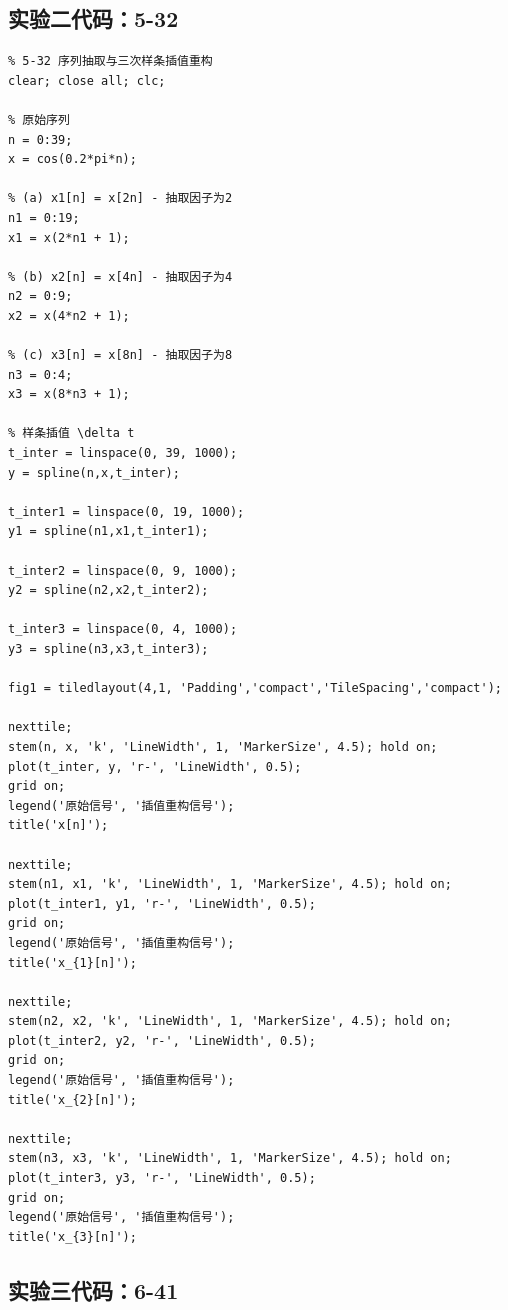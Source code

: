 \documentclass[UTF8,12pt,a4paper]{ctexart}
\begin{document}
\subsection{实验二代码：5-32}

\begin{lstlisting}
% 5-32 序列抽取与三次样条插值重构
clear; close all; clc;

% 原始序列
n = 0:39;
x = cos(0.2*pi*n);

% (a) x1[n] = x[2n] - 抽取因子为2
n1 = 0:19;
x1 = x(2*n1 + 1);

% (b) x2[n] = x[4n] - 抽取因子为4
n2 = 0:9;
x2 = x(4*n2 + 1);

% (c) x3[n] = x[8n] - 抽取因子为8
n3 = 0:4;
x3 = x(8*n3 + 1);

% 样条插值 \delta t
t_inter = linspace(0, 39, 1000);
y = spline(n,x,t_inter);

t_inter1 = linspace(0, 19, 1000);
y1 = spline(n1,x1,t_inter1);

t_inter2 = linspace(0, 9, 1000);
y2 = spline(n2,x2,t_inter2);

t_inter3 = linspace(0, 4, 1000);
y3 = spline(n3,x3,t_inter3);

fig1 = tiledlayout(4,1, 'Padding','compact','TileSpacing','compact');

nexttile; 
stem(n, x, 'k', 'LineWidth', 1, 'MarkerSize', 4.5); hold on;
plot(t_inter, y, 'r-', 'LineWidth', 0.5);
grid on;
legend('原始信号', '插值重构信号');
title('x[n]');

nexttile; 
stem(n1, x1, 'k', 'LineWidth', 1, 'MarkerSize', 4.5); hold on;
plot(t_inter1, y1, 'r-', 'LineWidth', 0.5);
grid on;
legend('原始信号', '插值重构信号');
title('x_{1}[n]');

nexttile; 
stem(n2, x2, 'k', 'LineWidth', 1, 'MarkerSize', 4.5); hold on;
plot(t_inter2, y2, 'r-', 'LineWidth', 0.5);
grid on;
legend('原始信号', '插值重构信号');
title('x_{2}[n]');

nexttile; 
stem(n3, x3, 'k', 'LineWidth', 1, 'MarkerSize', 4.5); hold on;
plot(t_inter3, y3, 'r-', 'LineWidth', 0.5);
grid on;
legend('原始信号', '插值重构信号');
title('x_{3}[n]');
\end{lstlisting}

\subsection{实验三代码：6-41}
\end{document}
